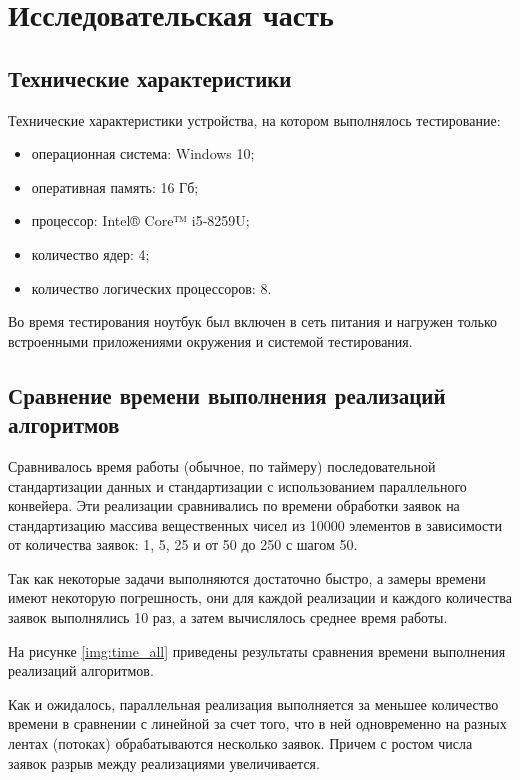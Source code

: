 \chapter{Исследовательская часть}

\section{Технические характеристики}

Технические характеристики устройства, на котором выполнялось тестирование:

\begin{itemize}
	\item операционная система: Windows 10;
	\item оперативная память: 16 Гб;
	\item процессор: Intel® Core™ i5-8259U;
	\item количество ядер: 4;
	\item количество логических процессоров: 8.
\end{itemize}

Во время тестирования ноутбук был включен в сеть питания и нагружен только встроенными приложениями окружения и системой тестирования.


\section{Сравнение времени выполнения реализаций алгоритмов}

Сравнивалось время работы (обычное, по таймеру) последовательной стандартизации данных и стандартизации с использованием параллельного конвейера.  Эти реализации сравнивались по времени обработки заявок на стандартизацию массива вещественных чисел из 10000 элементов в зависимости от количества заявок: 1, 5, 25 и от 50 до 250 с шагом 50. 
 
Так как некоторые задачи выполняются достаточно быстро, а замеры времени имеют некоторую погрешность, они для каждой реализации и каждого количества заявок выполнялись 10 раз, а затем вычислялось среднее время работы.
 

На рисунке \ref{img:time_all} приведены результаты сравнения времени выполнения реализаций алгоритмов. 



Как и ожидалось, параллельная реализация выполняется за меньшее количество времени в сравнении с линейной за счет того, что в ней одновременно на разных лентах (потоках) обрабатываются несколько заявок. Причем с ростом числа заявок разрыв между реализациями увеличивается.



